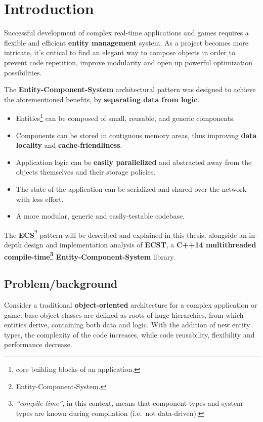 \documentclass[twoside, 12pt, a4paper, openany]{book}
\begin{document}
\newpage

\tableofcontents

\chapter{Introduction}\label{introduction}

Successful development of complex real-time applications and games
requires a flexible and efficient \textbf{entity management} system. As
a project becomes more intricate, it's critical to find an elegant way
to compose objects in order to prevent code repetition, improve
modularity and open up powerful optimization possibilities.

The \textbf{Entity-Component-System} architectural pattern was designed
to achieve the aforementioned benefits, by \textbf{separating data from
logic}.

\begin{itemize}
\item
  Entities\footnote{core building blocks of an application.} can be
  composed of small, reusable, and generic components.
\item
  Components can be stored in contiguous memory areas, thus improving
  \textbf{data locality} and \textbf{cache-friendliness}.
\item
  Application logic can be \textbf{easily parallelized} and abstracted
  away from the objects themselves and their storage policies.
\item
  The state of the application can be serialized and shared over the
  network with less effort.
\item
  A more modular, generic and easily-testable codebase.
\end{itemize}

The \textbf{ECS}\footnote{Entity-Component-System.} pattern will be
described and explained in this thesis, alongside an in-depth design and
implementation analysis of \textbf{ECST}, a \textbf{C++14 multithreaded
compile-time\footnote{\emph{``compile-time''}, in this context, means
  that component types and system types are known during compilation
  (i.e.~not data-driven).} Entity-Component-System} library.

\section{Problem/background}\label{problembackground}

Consider a traditional \textbf{object-oriented} architecture for a
complex application or game: base object classes are defined as roots of
huge hierarchies, from which entities derive, containing both data and
logic. With the addition of new entity types, the complexity of the code
increases, while code reusability, flexibility and performance decrease.
\end{document}

